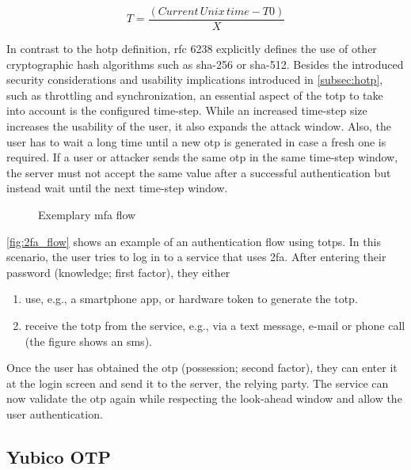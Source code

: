 \begin{equation*}
	T = \frac{(Current\, Unix\, time - T0)}{X}
\end{equation*}

In contrast to the \gls{hotp} definition, \gls{rfc} 6238 explicitly defines the use of other cryptographic hash algorithms such as \gls{sha}-256 or \gls{sha}-512. Besides the introduced security considerations and usability implications introduced in \autoref{subsec:hotp}, such as throttling and synchronization, an essential aspect of the \gls{totp} to take into account is the configured time-step. While an increased time-step size increases the usability of the user, it also expands the attack window. Also, the user has to wait a long time until a new \gls{otp} is generated in case a fresh one is required. If a user or attacker sends the same \gls{otp} in the same time-step window, the server must not accept the same value after a successful authentication but instead wait until the next time-step window.

\begin{figure}[hbt]
	\centering
	
	\caption[Exemplary \gls{mfa} flow]{Exemplary \gls{mfa} flow\footnotemark}
	\label{fig:2fa_flow}
\end{figure}

\autoref{fig:2fa_flow} shows an example of an authentication flow using \glspl{totp}. In this scenario, the user tries to log in to a service that uses \gls{2fa}. After entering their password (knowledge; first factor), they either

\begin{enumerate}[label=(\alph*)]
	\item use, e.g., a smartphone app, or hardware token to generate the \gls{totp}.
	\item receive the \gls{totp} from the service, e.g., via a text message, e-mail or phone call (the figure shows an \gls{sms}).
\end{enumerate}

Once the user has obtained the \gls{otp} (possession; second factor), they can enter it at the login screen and send it to the server, the relying party. The service can now validate the \gls{otp} again while respecting the look-ahead window and allow the user authentication.

\subsection{Yubico OTP}

